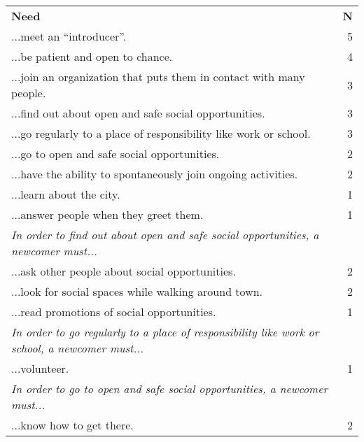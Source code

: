 \begin{longtable}{p{}r}
\textbf{Need}                                                                                              & \textbf{N} \\[12pt]
  ...meet an ``introducer''.                                                                               & 5 \\
  ...be patient and open to chance.                                                                        & 4 \\
  ...join an organization that puts them in contact with many people.                                      & 3 \\
  ...find out about open and safe social opportunities.                                                    & 3 \\
  ...go regularly to a place of responsibility like work or school.                                        & 3 \\
  ...go to open and safe social opportunities.                                                             & 2 \\
  ...have the ability to spontaneously join ongoing activities.                                            & 2 \\
  ...learn about the city.                                                                                 & 1 \\
  ...answer people when they greet them.                                                                   & 1 \\[12pt]
    \textit{In order to find out about open and safe social opportunities, a newcomer must...}             & \\
      ...ask other people about social opportunities.                                                      & 2 \\
      ...look for social spaces while walking around town.                                                 & 2 \\
      ...read promotions of social opportunities.                                                          & 1 \\[12pt]
    \textit{In order to go regularly to a place of responsibility like work or school, a newcomer must...} & \\
      ...volunteer.                                                                                        & 1 \\[12pt]
    \textit{In order to go to open and safe social opportunities, a newcomer must...}                      & \\
      ...know how to get there.                                                                            & 2 \\
\end{longtable}

